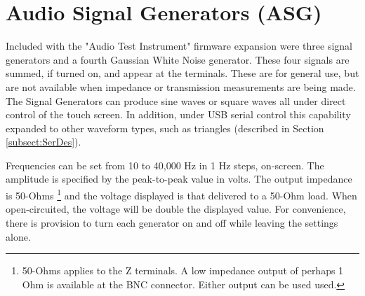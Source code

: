 \section{Audio Signal Generators (ASG)}
\label{sect:ASG}
Included with the "Audio Test Instrument" firmware expansion were three signal generators and a fourth Gaussian White Noise generator. These four signals are summed, if turned on, and appear at the  terminals.  These are for general use, but are not available when impedance or transmission measurements are being made.  The Signal Generators can produce sine waves or square waves all under direct control of the touch screen.  In addition, under USB serial control this capability  expanded to other waveform types, such as triangles (described in Section \ref{subsect:SerDes}).

Frequencies can be set from 10 to 40,000 Hz in 1 Hz steps, on-screen.  The amplitude is specified by the peak-to-peak value in volts.  The output impedance is 50-Ohms
%
\footnote{50-Ohms applies to the Z terminals.  A low impedance output of perhaps 1 Ohm is available at the BNC connector.  Either output can be used used.  }
%
 and the voltage displayed is that delivered to a 50-Ohm load. When open-circuited, the voltage will be double the displayed value.  For convenience, there is provision to turn each generator on and off while leaving the settings alone.


